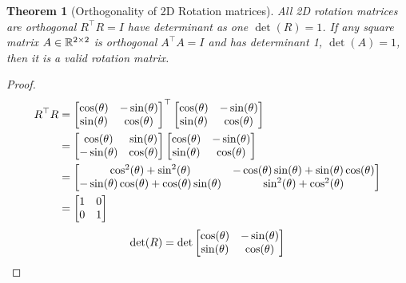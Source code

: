 \documentclass[twocolumn]{article}
\newtheorem{thm}{Theorem}
\begin{document}
\begin{thm}[Orthogonality of 2D Rotation matrices]
  All 2D rotation matrices  are orthogonal $R^\top R = I$ have determinant as one
  $\det(R) =  1$. If any square matrix $A \in \mathbb{R}^{2\times  2}$ is orthogonal $A^\top A = I$  and has
  determinant 1, $\det(A) = 1$, then  it is a valid rotation matrix.
\end{thm}
\begin{proof}
  \begin{align}
    R^\top R
    &= \begin{bmatrix}
      \cos(\theta)  &  -\sin(\theta)
      \\
      \sin(\theta) &   \cos(\theta)
    \end{bmatrix}^\top \begin{bmatrix}
      \cos(\theta)  &  -\sin(\theta)
      \\
      \sin(\theta) &   \cos(\theta)
    \end{bmatrix}
    \notag\\
    &=\begin{bmatrix}
      \cos(\theta)  &  \sin(\theta)
      \\
      -\sin(\theta) &   \cos(\theta)
    \end{bmatrix} \begin{bmatrix}
      \cos(\theta)  &  -\sin(\theta)
      \\
      \sin(\theta) &   \cos(\theta)
    \end{bmatrix}
  \notag\\
    &=\begin{bmatrix}
      \cos^2(\theta)+\sin^2(\theta)  &  -\cos(\theta)\sin(\theta)+\sin(\theta)\cos(\theta)
      \\
      -\sin(\theta)\cos(\theta)+\cos(\theta)\sin(\theta) &   \sin^2(\theta)+\cos^2(\theta)
    \end{bmatrix}
\notag\\
    &=\begin{bmatrix}
      1  &  0  \\ 0  &   1\end{bmatrix}
    \end{align}
    \begin{align}
      \det(R) &
                =  \det\begin{bmatrix}
        \cos(\theta)  &  -\sin(\theta)
        \\
        \sin(\theta) &   \cos(\theta)
        \end{bmatrix}
                       \notag\\

\end{align}
\end{proof}
\end{document}
